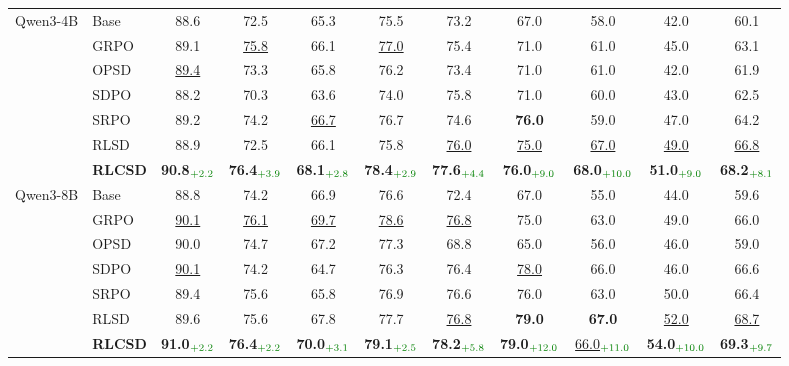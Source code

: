 \begin{table}[t]
{\begin{tabular}{llcccc ccccc}
\midrule

\multirow{7}{*}{Qwen3-4B}
 & Base  & 88.6 & 72.5 & 65.3 & 75.5 & 73.2 & 67.0 & 58.0 & 42.0 & 60.1 \\
 & GRPO  & 89.1 & \underline{75.8} & 66.1 & \underline{77.0} & 75.4 & 71.0 & 61.0 & 45.0 & 63.1 \\
 & OPSD  & \underline{89.4} & 73.3 & 65.8 & 76.2 & 73.4 & 71.0 & 61.0 & 42.0 & 61.9 \\
 & SDPO  & 88.2 & 70.3 & 63.6 & 74.0 & 75.8 & 71.0 & 60.0 & 43.0 & 62.5 \\
 & SRPO  & 89.2 & 74.2 & \underline{66.7} & 76.7 & 74.6 & \textbf{76.0} & 59.0 & 47.0 & 64.2 \\
 & RLSD  & 88.9 & 72.5 & 66.1 & 75.8 & \underline{76.0} & \underline{75.0} & \underline{67.0} & \underline{49.0} & \underline{66.8} \\
 \rowcolor{gray!30}
 & \textbf{RLCSD}
   & \textbf{90.8}$_{\textcolor{green!50!black}{+2.2}}$
   & \textbf{76.4}$_{\textcolor{green!50!black}{+3.9}}$
   & \textbf{68.1}$_{\textcolor{green!50!black}{+2.8}}$
   & \textbf{78.4}$_{\textcolor{green!50!black}{+2.9}}$
   & \textbf{77.6}$_{\textcolor{green!50!black}{+4.4}}$
   & \textbf{76.0}$_{\textcolor{green!50!black}{+9.0}}$
   & \textbf{68.0}$_{\textcolor{green!50!black}{+10.0}}$
   & \textbf{51.0}$_{\textcolor{green!50!black}{+9.0}}$
   & \textbf{68.2}$_{\textcolor{green!50!black}{+8.1}}$ \\

\midrule

\multirow{7}{*}{Qwen3-8B}
 & Base  & 88.8 & 74.2 & 66.9 & 76.6 & 72.4 & 67.0 & 55.0 & 44.0 & 59.6 \\
 & GRPO  & \underline{90.1} & \underline{76.1} & \underline{69.7} & \underline{78.6} & \underline{76.8} & 75.0 & 63.0 & 49.0 & 66.0 \\
 & OPSD  & 90.0 & 74.7 & 67.2 & 77.3 & 68.8 & 65.0 & 56.0 & 46.0 & 59.0 \\
 & SDPO  & \underline{90.1} & 74.2 & 64.7 & 76.3 & 76.4 & \underline{78.0} & 66.0 & 46.0 & 66.6 \\
 & SRPO  & 89.4 & 75.6 & 65.8 & 76.9 & 76.6 & 76.0 & 63.0 & 50.0 & 66.4 \\
 & RLSD  & 89.6 & 75.6 & 67.8 & 77.7 & \underline{76.8} & \textbf{79.0} & \textbf{67.0} & \underline{52.0} & \underline{68.7} \\
 \rowcolor{gray!30}
 & \textbf{RLCSD}
   & \textbf{91.0}$_{\textcolor{green!50!black}{+2.2}}$
   & \textbf{76.4}$_{\textcolor{green!50!black}{+2.2}}$
   & \textbf{70.0}$_{\textcolor{green!50!black}{+3.1}}$
   & \textbf{79.1}$_{\textcolor{green!50!black}{+2.5}}$
   & \textbf{78.2}$_{\textcolor{green!50!black}{+5.8}}$
   & \textbf{79.0}$_{\textcolor{green!50!black}{+12.0}}$
   & \underline{66.0}$_{\textcolor{green!50!black}{+11.0}}$
   & \textbf{54.0}$_{\textcolor{green!50!black}{+10.0}}$
   & \textbf{69.3}$_{\textcolor{green!50!black}{+9.7}}$ \\


\end{tabular}}
\end{table}
